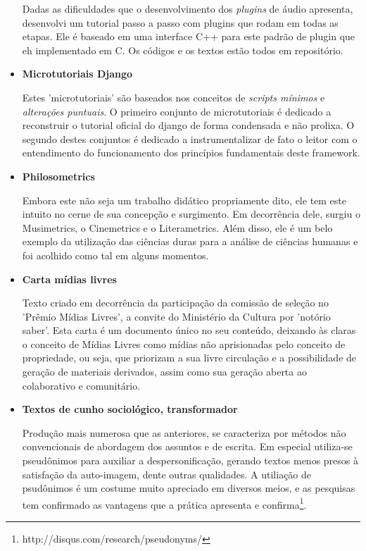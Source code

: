 \begin{itemize}
Dadas as dificuldades que o desenvolvimento dos \emph{plugins} de áudio apresenta,
desenvolvi um tutorial passo a passo com plugins que rodam em todas as etapas.
Ele é baseado em uma interface C++ para este padrão de plugin que eh implementado
em C. Os códigos e os textos estão todos em repositório.

    \item {\bf Microtutoriais Django ~\cite{dmicrotuts}}

Estes 'microtutoriais' são baseados nos conceitos de \emph{scripts mínimos} e
\emph{alterações puntuais}. O primeiro conjunto de microtutoriais é dedicado
a reconstruir o tutorial oficial do django de forma condensada e não prolixa.
O segundo destes conjuntos é dedicado a instrumentalizar de fato o leitor com
o entendimento do funcionamento dos princípios fundamentais deste framework.

    \item {\bf Philosometrics}

Embora este não seja um trabalho didático propriamente dito, ele tem este intuito
no cerne de sua concepção e surgimento. Em decorrência dele, surgiu o  Musimetrics,
o Cinemetrics e o Literametrics. Além disso, ele é um belo exemplo da
utilização das ciências duras para a análise de ciências humanas e foi acolhido
como tal em alguns momentos.

    \item {\bf Carta mídias livres}

Texto criado em decorrência da participação da comissão de seleção no
'Prêmio Mídias Livres', a convite do Ministério da Cultura por 'notório saber'.
Esta carta é um documento único no seu conteúdo, deixando às claras
o conceito de Mídias Livres como mídias não aprisionadas pelo conceito
de propriedade, ou seja, que priorizam a sua livre circulação e a possibilidade
de geração de materiais derivados, assim como sua geração aberta ao colaborativo e comunitário.

    \item {\bf Textos de cunho sociológico, transformador}

Produção mais numerosa que as anteriores, se caracteriza por métodos não convencionais
de abordagem dos assuntos e de escrita. Em especial utiliza-se pseudônimos para
auxiliar a despersonificação, gerando textos menos presos à satisfação da auto-imagem, dente
outras qualidades. A utiliação de psudônimos é um costume muito apreciado em diversos meios,
e as pesquisas tem confirmado as vantagens que a prática apresenta e confirma\footnote{http://disqus.com/research/pseudonyms/}.


\end{itemize}
